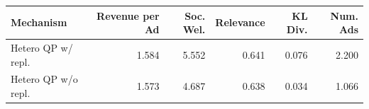 \begin{tabular}{lrrrrr}
\hline
Mechanism & Revenue per Ad & Soc. Wel. & Relevance & KL Div. & Num. Ads \\
\hline
Hetero QP w/ repl. & 1.584 & 5.552 & 0.641 & 0.076 & 2.200 \\
Hetero QP w/o repl. & 1.573 & 4.687 & 0.638 & 0.034 & 1.066 \\
\hline
\end{tabular}
